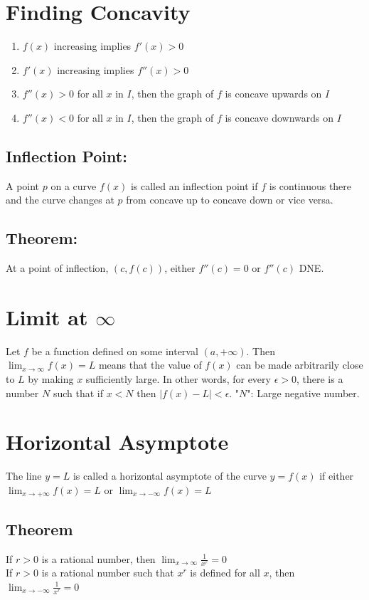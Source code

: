 \documentclass[12pt]{article}
\begin{document}
\section{Finding Concavity}
\begin{enumerate}
    \item $f(x)$ increasing implies $f'(x)>0$
    \item $f'(x)$ increasing implies $f''(x)>0$
    \item $f''(x)>0$ for all $x$ in $I$, then the graph of $f$ is concave upwards on $I$
    \item $f''(x)<0$ for all $x$ in $I$, then the graph of $f$ is concave downwards on $I$
\end{enumerate}

\subsection{Inflection Point:} A point $p$ on a curve $f(x)$ is called an inflection point if $f$ is continuous there and the curve changes at $p$ from concave up to concave down or vice versa.

\subsection{Theorem:} At a point of inflection, $(c, f(c))$, either $f''(c)=0$ or $f''(c)$ DNE.

\section{Limit at $\infty{}$} Let $f$ be a function defined on some interval $(a, +\infty{})$. Then $\lim_{x \to \infty{}} f(x) = L$ means that the value of $f(x)$ can be made arbitrarily close to $L$ by making $x$ sufficiently large. In other words, for every $\epsilon > 0$, there is a number $N$ such that if $x<N$ then $|f(x)-L| < \epsilon$. "$N$": Large negative number.

\section{Horizontal Asymptote} The line $y=L$ is called a  horizontal asymptote of the curve $y=f(x)$ if either $\lim_{x \to +\infty{}} f(x) = L$ or $\lim_{x \to -\infty{}} f(x) = L$

\subsection{Theorem} If $r>0$ is a rational number, then $\lim_{x \to \infty{}} \frac{1}{x^r} = 0$\\
If $r>0$ is a rational number such that $x^r$ is defined for all $x$, then $\lim_{x \to -\infty{}} \frac{1}{x^r} = 0$
\end{document}
